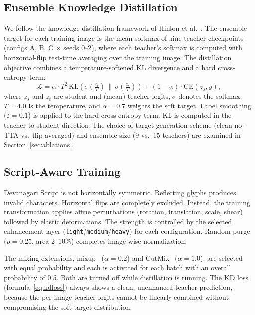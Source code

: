 \subsection{Ensemble Knowledge Distillation}
\label{sec:kd}

We follow the knowledge distillation framework of Hinton et al.~\cite{hinton2015distill}. The ensemble target for each training image is the mean softmax of nine teacher checkpoints (configs A, B, C $\times$ seeds 0--2), where each teacher's softmax is computed with horizontal-flip test-time averaging over the training image. The distillation objective combines a temperature-softened KL divergence and a hard cross-entropy term:
\begin{equation}
  \mathcal{L} = \alpha \cdot T^{2}\,
    \mathrm{KL}\!\left(
      \sigma\!\left(\tfrac{z_{t}}{T}\right) \,\Big\|\,
      \sigma\!\left(\tfrac{z_{s}}{T}\right)
    \right)
    + (1-\alpha)\cdot\mathrm{CE}(z_{s}, y),
  \label{eq:kdloss}
\end{equation}
where $z_{s}$ and $z_{t}$ are student and (mean) teacher logits, $\sigma$ denotes the softmax, $T = 4.0$ is the temperature, and $\alpha = 0.7$ weights the soft target. Label smoothing ($\varepsilon = 0.1$) is applied to the hard cross-entropy term. KL is computed in the teacher-to-student direction. The choice of target-generation scheme (clean no-TTA vs.\ flip-averaged) and ensemble size (9 vs.\ 15 teachers) are examined in Section~\ref{sec:ablations}.

\subsection{Script-Aware Training}
\label{sec:training}

Devanagari Script is not horizontally symmetric. Reflecting glyphs produces invalid characters. Horizontal flips are completely excluded. Instead, the training transformation applies affine perturbations (rotation, translation, scale, shear) followed by elastic deformations. The strength is controlled by the selected enhancement layer (\texttt{light}/\texttt{medium}/\texttt{heavy}) for each configuration. Random purge ($p = 0.25$, area 2--10\%) completes image-wise normalization.

The mixing extensions, mixup~\cite{zhang2018mixup} ($\alpha = 0.2$) and CutMix~\cite{yun2019cutmix} ($\alpha = 1.0$), are selected with equal probability and each is activated for each batch with an overall probability of 0.5. Both are turned off while distillation is running. The KD loss (formula~\ref{eq:kdloss}) always shows a clean, unenhanced teacher prediction, because the per-image teacher logits cannot be linearly combined without compromising the soft target distribution.

